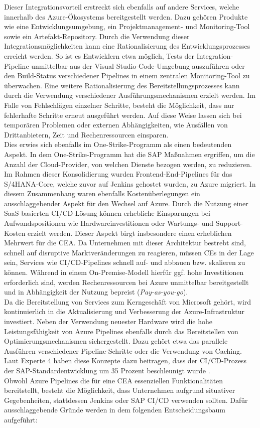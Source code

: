 Dieser Integrationsvorteil erstreckt sich ebenfalls auf andere Services, welche innerhalb des Azure-Ökosystems bereitgestellt werden. Dazu gehören Produkte wie eine Entwicklungsumgebung, ein Projektmanagement- und Monitoring-Tool sowie ein Artefakt-Repository. Durch die Verwendung dieser Integrationsmöglichkeiten kann eine Rationalisierung des Entwicklungsprozesses erreicht werden. So ist es Entwicklern etwa möglich, Tests der Integration-Pipeline unmittelbar aus der Visual-Studio-Code-Umgebung auszuführen oder den Build-Status verschiedener Pipelines in einem zentralen Monitoring-Tool zu überwachen. Eine weitere Rationalisierung des Bereitstellungsprozesses kann durch die Verwendung verschiedener Ausführungs\-mechanismen erzielt werden. Im Falle von Fehlschlägen einzelner Schritte, besteht die Möglichkeit, dass nur fehlerhafte Schritte erneut ausgeführt werden. Auf diese Weise lassen sich bei temporären Problemen oder externen Abhängigkeiten, wie Ausfällen von Drittanbietern, Zeit und Rechenressourcen einsparen.\\ Dies erwies sich ebenfalls im One-Strike-Programm als einen bedeutenden Aspekt. In dem One-Strike-Programm hat die SAP Maßnahmen ergriffen, um die Anzahl der Cloud-Provider, von welchen Dienste bezogen werden, zu reduzieren. Im Rahmen dieser Konsolidierung wurden Frontend-End-Pipelines für das S/4HANA-Core, welche zuvor auf Jenkins gehostet wurden, zu Azure migriert. In diesem Zusammenhang waren ebenfalls Kostenüberlegungen ein ausschlaggebender Aspekt für den Wechsel auf Azure. Durch die Nutzung einer SaaS-basierten CI/CD-Lösung können erhebliche Einsparungen bei Aufwandspositionen wie Hardwareinvestitionen oder Wartungs- und Support-Kosten erzielt werden. Dieser Aspekt birgt insbesondere einen erheblichen Mehrwert für die CEA. Da Unternehmen mit dieser Architektur bestrebt sind, schnell auf disruptive Marktveränderungen zu reagieren, müssen CEs in der Lage sein, Services wie CI/CD-Pipelines schnell auf- und abbauen bzw. skalieren zu können. Während in einem On-Premise-Modell hierfür ggf. hohe Investitionen erforderlich sind, werden Rechenressourcen bei Azure unmittelbar bereitgestellt und in Abhängigkeit der Nutzung bepreist (\textit{Pay-as-you-go}).\\ Da die Bereitstellung von Services zum Kerngeschäft von Microsoft gehört, wird kontinuierlich in die Aktualisierung und Verbesserung der Azure-Infrastruktur investiert. Neben der Verwendung neuester Hardware wird die hohe Leistungsfähigkeit von Azure Pipelines ebenfalls durch das Bereitstellen von Optimierungsmechanismen sichergestellt. Dazu gehört etwa das parallele Ausführen verschiedener Pipeline-Schritte oder die Verwendung von Caching. Laut Experte 4 haben diese Konzepte dazu beitragen, dass der CI/CD-Prozess der SAP-Standardentwicklung um 35 Prozent beschleunigt wurde \cite[Z. 58 ff.]{TestDeveloperSAPHyperspaceAdoption&Onboarding.}.\\ Obwohl Azure Pipelines die für eine CEA essenziellen Funktionalitäten bereitstellt, besteht die Möglichkeit, dass Unternehmen aufgrund situativer Gegebenheiten, stattdessen Jenkins oder SAP CI/CD verwenden sollten. Dafür ausschlaggebende Gründe werden in dem folgenden Entscheidungsbaum aufgeführt:
